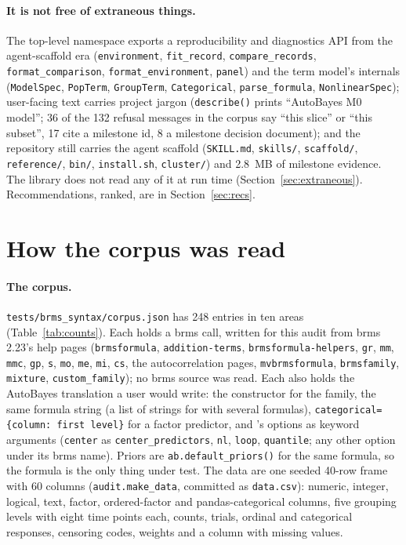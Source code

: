 \documentclass[11pt]{article}
\newcommand{\code}[1]{\texttt{#1}}
\newcommand{\file}[1]{\texttt{#1}}
\newcommand{\f}[1]{\texttt{\detokenize{#1}}}
\begin{document}
\paragraph{It is not free of extraneous things.} The top-level namespace exports a reproducibility and diagnostics API
from the agent-scaffold era (\code{environment}, \code{fit\_record}, \code{compare\_records}, \code{format\_comparison},
\code{format\_environment}, \code{panel}) and the term model's internals (\code{ModelSpec}, \code{PopTerm},
\code{GroupTerm}, \code{Categorical}, \code{parse\_formula}, \code{NonlinearSpec}); user-facing text carries project jargon
(\code{describe()} prints ``AutoBayes M0 model''; 36 of the 132 refusal messages in the corpus say ``this slice'' or
``this subset'', 17 cite a milestone id, 8 a milestone decision document); and the repository still carries the agent
scaffold (\file{SKILL.md}, \file{skills/}, \file{scaffold/}, \file{reference/}, \file{bin/}, \file{install.sh},
\file{cluster/}) and 2.8~MB of milestone evidence. The library does not read any of it at run time
(Section~\ref{sec:extraneous}). Recommendations, ranked, are in Section~\ref{sec:recs}.

\section{How the corpus was read}\label{sec:method}

\paragraph{The corpus.} \file{tests/brms\_syntax/corpus.json} has 248 entries in ten areas (Table~\ref{tab:counts}). Each
holds a brms call, written for this audit from brms 2.23's help pages (\code{brmsformula}, \code{addition-terms},
\code{brmsformula-helpers}, \code{gr}, \code{mm}, \code{mmc}, \code{gp}, \code{s}, \code{mo}, \code{me}, \code{mi},
\code{cs}, the autocorrelation pages, \code{mvbrmsformula}, \code{brmsfamily}, \code{mixture}, \code{custom\_family}); no
brms source was read. Each also holds the AutoBayes translation a user would write: the constructor for the family, the
same formula string (a list of strings for \f{bf()} with several formulas), \code{categorical=\{column: first level\}}
for a factor predictor, and \f{bf()}'s options as keyword arguments (\code{center} as \code{center\_predictors},
\code{nl}, \code{loop}, \code{quantile}; any other option under its brms name). Priors are \code{ab.default\_priors()}
for the same formula, so the formula is the only thing under test. The data are one seeded 40-row frame with 60 columns
(\code{audit.make\_data}, committed as \file{data.csv}): numeric, integer, logical, text, factor, ordered-factor and
pandas-categorical columns, five grouping levels with eight time points each, counts, trials, ordinal and categorical
responses, censoring codes, weights and a column with missing values.
\end{document}
